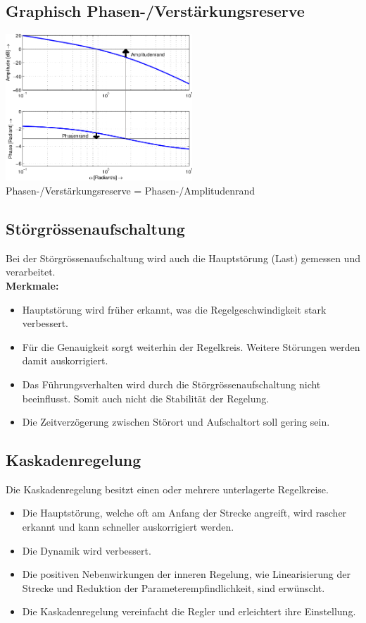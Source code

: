 \begin{multicols}{2}
  \subsection{Graphisch Phasen-/Verstärkungsreserve}
    \includegraphics[width=7cm]{./images/bode-stabilitaet.png} \\
    Phasen-/Verstärkungsreserve = Phasen-/Amplitudenrand
    
\columnbreak

  \subsection{Störgrössenaufschaltung }
    Bei der Störgrössenaufschaltung wird auch die Hauptstörung (Last) gemessen und verarbeitet.\\
    \textbf{Merkmale:}
    \begin{itemize}[leftmargin=*]
      \item Hauptstörung wird früher erkannt, was die Regelgeschwindigkeit stark verbessert.
      \item Für die Genauigkeit sorgt weiterhin der Regelkreis. Weitere Störungen werden damit auskorrigiert.
      \item Das Führungsverhalten wird durch die Störgrössenaufschaltung nicht beeinflusst. Somit auch nicht
            die Stabilität der Regelung.
      \item Die Zeitverzögerung zwischen Störort und Aufschaltort soll gering sein.
    \end{itemize}
\end{multicols}

\subsection{Kaskadenregelung }
  Die Kaskadenregelung besitzt einen oder mehrere unterlagerte Regelkreise.\\
  \begin{itemize}
    \item Die Hauptstörung, welche oft am Anfang der Strecke angreift, wird rascher erkannt und kann
          schneller auskorrigiert werden.
    \item Die Dynamik wird verbessert.
    \item Die positiven Nebenwirkungen der inneren Regelung, wie Linearisierung der Strecke
          und Reduktion der Parameterempfindlichkeit, sind erwünscht.
    \item Die Kaskadenregelung vereinfacht die Regler und erleichtert ihre Einstellung.
  \end{itemize}

